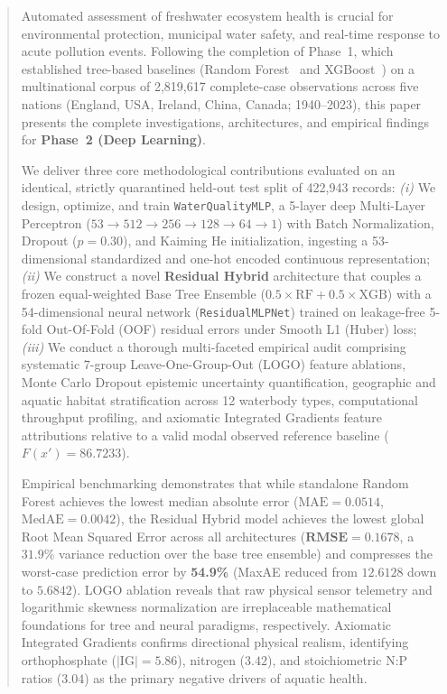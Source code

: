 \documentclass[conference]{IEEEtran}
\begin{document}
\begin{abstract}
Automated assessment of freshwater ecosystem health is crucial for environmental
protection, municipal water safety, and real-time response to acute pollution events.
Following the completion of Phase~1, which established tree-based baselines
(Random Forest~\cite{breiman2001random} and XGBoost~\cite{chen2016xgboost}) on a multinational corpus of 2,819,617 complete-case
observations across five nations (England, USA, Ireland, China, Canada; 1940--2023),
this paper presents the complete investigations, architectures, and empirical findings
for \textbf{Phase~2 (Deep Learning)}. 

We deliver three core methodological contributions evaluated on an identical, strictly
quarantined held-out test split of 422,943 records:
\emph{(i)} We design, optimize, and train \texttt{WaterQualityMLP}, a 5-layer deep
Multi-Layer Perceptron ($53 \to 512 \to 256 \to 128 \to 64 \to 1$) with Batch Normalization,
Dropout ($p=0.30$), and Kaiming He initialization, ingesting a 53-dimensional standardized
and one-hot encoded continuous representation;
\emph{(ii)} We construct a novel \textbf{Residual Hybrid} architecture that couples a frozen
equal-weighted Base Tree Ensemble ($0.5\times\text{RF} + 0.5\times\text{XGB}$) with a
54-dimensional neural network (\texttt{ResidualMLPNet}) trained on leakage-free 5-fold
Out-Of-Fold (OOF) residual errors under Smooth L1 (Huber) loss;
\emph{(iii)} We conduct a thorough multi-faceted empirical audit comprising systematic
7-group Leave-One-Group-Out (LOGO) feature ablations, Monte Carlo Dropout epistemic uncertainty
quantification, geographic and aquatic habitat stratification across 12 waterbody types,
computational throughput profiling, and axiomatic Integrated Gradients feature attributions
relative to a valid modal observed reference baseline ($F(x') = 86.7233$).

Empirical benchmarking demonstrates that while standalone Random Forest achieves the lowest
median absolute error ($\text{MAE} = 0.0514$, $\text{MedAE} = 0.0042$), the Residual Hybrid
model achieves the lowest global Root Mean Squared Error across all architectures
($\mathbf{\text{RMSE} = 0.1678}$, a $31.9\%$ variance reduction over the base tree ensemble)
and compresses the worst-case prediction error by \textbf{54.9\%} (MaxAE reduced from $12.6128$
down to $\mathbf{5.6842}$). LOGO ablation reveals that raw physical sensor telemetry and logarithmic
skewness normalization are irreplaceable mathematical foundations for tree and neural paradigms,
respectively. Axiomatic Integrated Gradients confirms directional physical realism, identifying
orthophosphate ($|\text{IG}| = 5.86$), nitrogen ($3.42$), and stoichiometric $\text{N}:\text{P}$
ratios ($3.04$) as the primary negative drivers of aquatic health.
\end{abstract}
\end{document}
